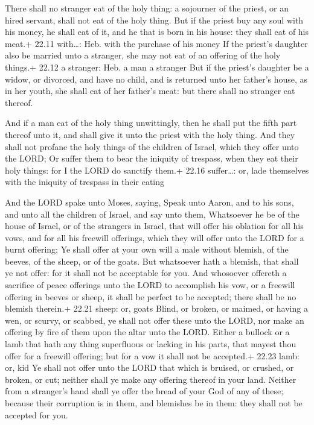  There shall no stranger eat of the holy thing: a sojourner
of the priest, or an hired servant, shall not eat of the holy thing.
 But if the priest buy any soul with his money, he shall
eat of it, and he that is born in his house: they shall eat of his
meat.+ 22.11 with\ldots: Heb. with the purchase of his money
 If the priest's daughter also be married unto a stranger,
she may not eat of an offering of the holy things.+ 22.12 a stranger:
Heb. a man a stranger  But if the priest's daughter be a
widow, or divorced, and have no child, and is returned unto her father's
house, as in her youth, she shall eat of her father's meat: but there
shall no stranger eat thereof.

 And if a man eat of the holy thing unwittingly, then he
shall put the fifth part thereof unto it, and shall give it unto the
priest with the holy thing.  And they shall not profane the
holy things of the children of Israel, which they offer unto the LORD;
 Or suffer them to bear the iniquity of trespass, when they
eat their holy things: for I the LORD do sanctify them.+ 22.16
suffer\ldots: or, lade themselves with the iniquity of trespass in their
eating

 And the LORD spake unto Moses, saying, 
Speak unto Aaron, and to his sons, and unto all the children of Israel,
and say unto them, Whatsoever he be of the house of Israel, or of the
strangers in Israel, that will offer his oblation for all his vows, and
for all his freewill offerings, which they will offer unto the LORD for
a burnt offering;  Ye shall offer at your own will a male
without blemish, of the beeves, of the sheep, or of the goats.
 But whatsoever hath a blemish, that shall ye not offer:
for it shall not be acceptable for you.  And whosoever
offereth a sacrifice of peace offerings unto the LORD to accomplish his
vow, or a freewill offering in beeves or sheep, it shall be perfect to
be accepted; there shall be no blemish therein.+ 22.21 sheep: or, goats
 Blind, or broken, or maimed, or having a wen, or scurvy,
or scabbed, ye shall not offer these unto the LORD, nor make an offering
by fire of them upon the altar unto the LORD.  Either a
bullock or a lamb that hath any thing superfluous or lacking in his
parts, that mayest thou offer for a freewill offering; but for a vow it
shall not be accepted.+ 22.23 lamb: or, kid  Ye shall not
offer unto the LORD that which is bruised, or crushed, or broken, or
cut; neither shall ye make any offering thereof in your land.
 Neither from a stranger's hand shall ye offer the bread of
your God of any of these; because their corruption is in them, and
blemishes be in them: they shall not be accepted for you.

